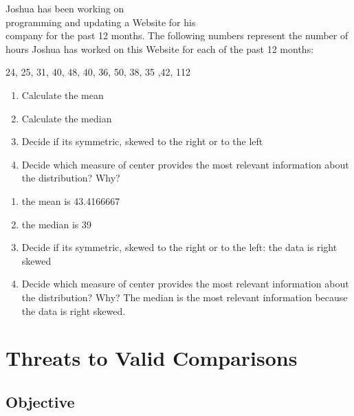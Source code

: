 \documentclass[11pt, chapterprefix=true]{scrbook}\usepackage[]{graphicx}\usepackage[]{color}
\begin{document}
\begin{exercises}
   \begin{exercise} %

Joshua has been working on \\ programming  and updating a Website for his \\ company for the past 12 months. The following numbers represent the number of hours Joshua  has worked on this Website for each of the past 12 months:

24, 25, 31, 40, 48, 40, 36, 50, 38, 35 ,42, 112

\begin{enumerate}
\item Calculate the mean
\item Calculate the median
\item Decide if its symmetric, skewed to the right or to the left
\item Decide which measure of center provides the most relevant information about the distribution? Why?
\end{enumerate}

\end{exercise}
\begin{solution}


\begin{enumerate}
\item the mean is 43.4166667
\item the median is 39
\item Decide if its symmetric, skewed to the right or to the left: the data is right skewed
\item Decide which measure of center provides the most relevant information about the distribution? Why?  The median is the most relevant information because the data is right skewed.
\end{enumerate}

\end{solution}

\end{exercises}

\onecolumn



\chapter{Threats to Valid Comparisons}
\label{chap:ch4}

\section{Objective}
\end{document}
